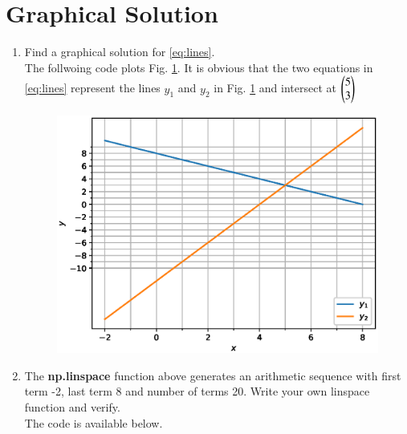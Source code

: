 \documentclass[journal,12pt,twocolumn]{IEEEtran}
\renewcommand\thesection{\arabic{section}}
\begin{document}
\section{Graphical Solution}
\begin{enumerate}[label=\thesection.\arabic*
,ref=\thesection.\theenumi]
\item Find a graphical solution for \eqref{eq:lines}.
\label{prob:graph}
\\
\solution The follwoing code plots Fig. \ref{fig:draw_line}.  It is obvious that the two equations in 
\eqref{eq:lines} represent the lines $y_1$ and $y_2$ in Fig. \ref{fig:draw_line} and intersect at $\begin{pmatrix}5 
\\3\end{pmatrix}$

%
\begin{figure}
\centering
\includegraphics[width=\columnwidth]{./figs/draw_line.eps}
\caption{}
\label{fig:draw_line}
\end{figure}
\item The \textbf{np.linspace} function above generates an arithmetic sequence with first term -2, last term 8 
and 
number of terms 20.  Write your own linspace function and verify.
\\
\solution The code is available below.

\end{enumerate}
\end{document}
